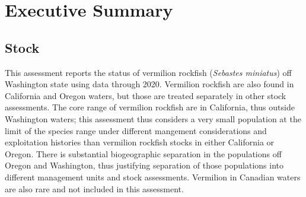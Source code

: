 \documentclass[11pt,
  english,
  a4paper,
]{article}
\begin{document}
\newcommand{\lt}{\ensuremath <}
\newcommand{\gt}{\ensuremath >}

\vspace{500cm}

\pagebreak
{}
\setcounter{page}{1}

\renewcommand{\thetable}{\roman{table}}
\renewcommand{\thefigure}{\roman{figure}}

\setlength\parskip{0.5em plus 0.1em minus 0.2em}


\hypertarget{executive-summary}{%
\section*{Executive Summary}\label{executive-summary}}

\leavevmode\tagmcend\tagstructend


\hypertarget{stock}{%
\subsection*{Stock}\label{stock}}

\leavevmode\tagmcend\tagstructend


This assessment reports the status of vermilion rockfish (\emph{Sebastes miniatus}) off Washington state using data through 2020. Vermilion rockfish are also found in California and Oregon waters, but those are treated separately in other stock assessments. The core range of vermilion rockfish are in California, thus outside Washington waters; this assessment thus considers a very small population at the limit of the species range under different mangement considerations and exploitation histories than vermilion rockfish stocks in either California or Oregon. There is substantial biogeographic separation in the populations off Oregon and Washington, thus justifying separation of those populations into different management units and stock assessments. Vermilion in Canadian waters are also rare and not included in this assessment.

\leavevmode\tagmcend\tagstructend\par

\end{document}
